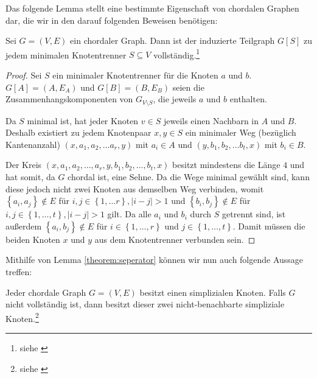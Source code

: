 Das folgende Lemma stellt eine bestimmte Eigenschaft von chordalen Graphen dar, die wir in den darauf folgenden Beweisen benötigen:

\begin{lemma}
	Sei \( G = \left( V, E \right) \) ein chordaler Graph. Dann ist der induzierte Teilgraph \( G \left[ S \right] \) zu jedem minimalen Knotentrenner \( S \subseteq V \) vollständig.\footnote{siehe \cite[Satz 4.1 (i) \( \Rightarrow \) (iii)]{golumbic}}
	\label{theorem:seperator}
\end{lemma}

\begin{proof}
	Sei \( S \) ein minimaler Knotentrenner für die Knoten \( a \) und \( b \). \( G \left[ A \right] = \left( A, E_A \right)\) und \( G \left[ B \right] = \left( B, E_B \right)\) seien die Zusammenhangskomponenten von \( G_{V \setminus S} \), die jeweils \( a \) und \( b \) enthalten.

	Da \( S \) minimal ist, hat jeder Knoten \( v \in S \) jeweils einen Nachbarn in \( A \) und \( B \).
	Deshalb existiert zu jedem Knotenpaar \( x, y \in S \) ein minimaler Weg (bezüglich Kantenanzahl) \( \left( x, a_1, a_2, \ldots a_r, y \right) \) mit \( a_i \in A \) und \( \left( y, b_1, b_2, \ldots b_t, x \right) \) mit \( b_i \in B \).

	Der Kreis \( \left( x, a_1, a_2, \ldots, a_r, y, b_1, b_2, \ldots, b_t, x \right) \) besitzt mindestens die Länge \( 4 \) und hat somit, da \( G \) chordal ist, eine Sehne.
	Da die Wege minimal gewählt sind, kann diese jedoch nicht zwei Knoten aus demselben Weg verbinden, womit \( \left\lbrace a_i, a_j \right\rbrace \not\in E\) für \( i, j \in \left\lbrace 1, \ldots r \right\rbrace, \left| i - j \right| > 1 \) und \( \left\lbrace b_i, b_j \right\rbrace \not\in E \) für \( i, j \in \left\lbrace 1, \ldots, t \right\rbrace, \left| i - j \right| > 1 \) gilt. Da alle \( a_i \) und \( b_i \) durch \( S \) getrennt sind, ist außerdem \(\left\lbrace a_i, b_j \right\rbrace \not\in E \) für \( i \in \left\lbrace 1, \ldots, r \right\rbrace \) und \( j \in \left\lbrace 1, \ldots, t \right\rbrace \). Damit müssen die beiden Knoten \( x \) und \( y \) aus dem Knotentrenner verbunden sein.
\end{proof}

Mithilfe von Lemma \ref{theorem:seperator} können wir nun auch folgende Aussage treffen:

\begin{lemma}
	Jeder chordale Graph \( G = \left( V, E \right) \) besitzt einen simplizialen Knoten. Falls \( G \) nicht vollständig ist, dann besitzt dieser zwei nicht-benachbarte simpliziale Knoten.\footnote{siehe \cite[Lemma 4.2]{golumbic}}
	\label{theorem:simplicial}
\end{lemma}

